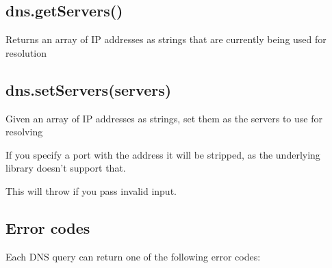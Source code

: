 \subsection{dns.getServers()}\label{dns.getservers}

Returns an array of IP addresses as strings that are currently being
used for resolution

\subsection{dns.setServers(servers)}\label{dns.setserversservers}

Given an array of IP addresses as strings, set them as the servers to
use for resolving

If you specify a port with the address it will be stripped, as the
underlying library doesn't support that.

This will throw if you pass invalid input.

\subsection{Error codes}\label{error-codes}

Each DNS query can return one of the following error codes:

